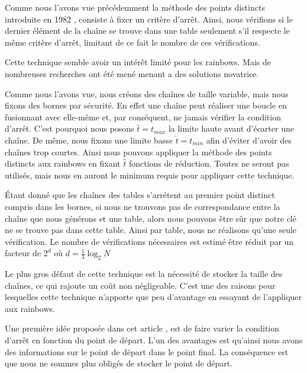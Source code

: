	Comme nous l'avons vue précédemment la méthode des points distincts introduite en 1982 \cite{Rivest}, consiste à fixer un critère d'arrêt. Ainsi, nous vérifions si le dernier élément de la chaîne se trouve dans une table seulement s'il respecte le même critère d'arrêt, limitant de ce fait le nombre de ces vérifications.

	\bigskip

	Cette technique semble avoir un intérêt limité pour les \glspl{rainbow}. Mais de nombreuses recherches ont été mené menant a des solutions novatrice.

	\bigskip


		Comme nous l'avons vue, nous créons des chaînes de taille variable, mais nous fixons des bornes par sécurité. En effet une chaîne peut réaliser une boucle en fusionnant avec elle-même et, par conséquent, ne jamais vérifier la condition d'arrêt. C'est pourquoi nous posons $\hat{t}=t_{max}$ la limite haute avant d'écarter une chaîne. De même, nous fixons une limite basse $\check{t}=t_{min}$ afin d'éviter d'avoir des chaînes trop courtes. Ainsi nous pouvons appliquer la méthode des points distincts aux \glspl{rainbow} en fixant $\hat{t}$ fonctions de réduction. Toutes ne seront pas utilisés, mais nous en auront le minimum requis pour appliquer cette technique.

		\bigskip

		Étant donné que les chaînes des tables s'arrêtent au premier point distinct compris dans les bornes, si nous ne trouvons pas de correspondance entre la chaîne que nous générons et une table, alors nous pouvons être sûr que notre clé ne se trouve pas dans cette table. Ainsi par table, nous ne réalisons qu'une seule vérification. Le nombre de vérifications nécessaires est estimé être réduit par un facteur de $2^d$ où $d=\frac{1}{3}\log_2 N$

		\bigskip

		Le plus gros défaut de cette technique est la nécessité de stocker la taille des chaînes, ce qui rajoute un coût non négligeable. C'est une des raisons pour lesquelles cette technique n'apporte que peu d'avantage en essayant de l'appliquer aux \glspl{rainbow}.

		\bigskip


		Une première idée proposée dans cet article \cite{VDP}, est de faire varier la condition d'arrêt en fonction du point de départ. L'un des avantages est qu'ainsi nous avons des informations sur le point de départ dans le point final. La conséquence est que nous ne sommes plus obligés de stocker le point de départ.

